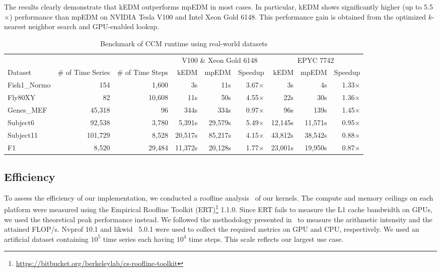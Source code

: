 \documentclass[sigconf]{acmart}
\begin{document}
The results clearly demonstrate that kEDM outperforms mpEDM in most
cases. In particular, kEDM shows significantly higher (up to 5.5$\times$)
performance than mpEDM on NVIDIA Tesla V100 and Intel Xeon Gold 6148.
This performance gain is obtained from the optimized $k$-nearest neighbor search and GPU-enabled lookup.

\begin{table}
\centering
\caption{Benchmark of CCM runtime using real-world datasets}%
\label{tbl:real-world}
\begin{tabular}{@{}lrrrrrrrr@{}}
\toprule
             & \multicolumn{1}{c}{} & \multicolumn{1}{c}{} & \multicolumn{3}{c}{V100 \& Xeon Gold 6148 } & \multicolumn{3}{c}{EPYC 7742} \\ \cmidrule(l){4-6}  \cmidrule(l){7-9}
Dataset      & \multicolumn{1}{c}{\# of Time Series} & \multicolumn{1}{c}{\# of Time Steps} & kEDM & mpEDM & Speedup & kEDM & mpEDM & Speedup \\ \midrule
Fish1\_Normo &  154    & 1,600  &      3s &     11s & 3.67$\times$ &      3s &      4s & 1.33$\times$ \\
Fly80XY      &  82     & 10,608 &     11s &     50s & 4.55$\times$ &     22s &     30s & 1.36$\times$ \\
Genes\_MEF   &  45,318 & 96     &    344s &    334s & 0.97$\times$ &     96s &    139s & 1.45$\times$ \\
Subject6     &  92,538 & 3,780  &  5,391s & 29,579s & 5.49$\times$ & 12,145s & 11,571s & 0.95$\times$ \\
Subject11    & 101,729 & 8,528  & 20,517s & 85,217s & 4.15$\times$ & 43,812s & 38,542s & 0.88$\times$ \\
F1           &  8,520  & 29,484 & 11,372s & 20,128s & 1.77$\times$ & 23,001s & 19,950s & 0.87$\times$ \\ \bottomrule
\end{tabular}
\end{table}

\subsection{Efficiency}

To assess the efficiency of our implementation, we conducted a roofline
analysis~\cite{Williams2008} of our kernels. The compute and memory ceilings
on each platform were measured using the Empirical Roofline Toolkit (ERT)\footnote{\url{https://bitbucket.org/berkeleylab/cs-roofline-toolkit}} 1.1.0.
Since ERT fails to measure the L1 cache bandwidth on GPUs, we used the
theoretical peak performance instead. We followed the methodology presented
in~\cite{Yang2020b} to measure the arithmetic intensity and the
attained FLOP/s. Nvprof 10.1 and likwid~\cite{Treibig2010} 5.0.1 were used to
collect the required metrics on GPU and CPU, respectively.
We used an artificial dataset containing $10^5$ time series each having $10^4$
time steps. This scale reflects our largest use case.
\end{document}
